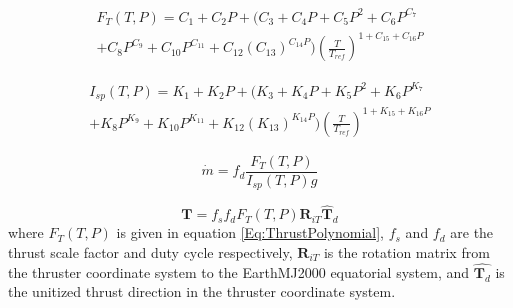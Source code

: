\begin{footnotesize}

\begin{equation}
\begin{split}
    F_T(T,P) = C_1 + C_2 P +  (C_3 + C_4 P + C_5 P^2 + C_6 P^{C_7}\\ +  C_8P^{C_9}
     + C_{10}P^{C_{11}}
    + C_{12}(C_{13})^{C_{14}P})\left(\frac{T}{T_{ref}}\right)^{1 + C_{15} + C_{16}P }
    \label{Eq:ThrustPolynomial}
     \end{split}
\end{equation}

%
\begin{equation}
\begin{split}
    I_{sp}(T,P) = K_1 + K_2 P + (K_3 + K_4 P + K_5 P^2 + K_6 P^{K_7} \\ + K_8P^{K_9} + K_{10}P^{K_{11}}
    + K_{12}(K_{13})^{K_{14}P})\left(\frac{T}{T_{ref}}\right)^{1 + K_{15} + K_{16}P }
         \end{split}
\end{equation}
\end{footnotesize}

\begin{equation}
    \dot{m} =  f_d\frac{F_T(T,P)}{I_{sp}(T,P)g}
\end{equation}

\begin{equation}
    \mathbf{T} = f_s f_d F_T(T,P) \mathbf{R}_{iT}\hat{\mathbf{T}}_d
\end{equation}
%
where $F_T(T,P)$ is given in equation \ref{Eq:ThrustPolynomial},
$f_s$ and $f_d$ are the thrust scale factor and duty cycle
respectively, $\mathbf{R}_{iT}$ is the rotation matrix from the
thruster coordinate system to the EarthMJ2000 equatorial system, and
$\hat{\mathbf{T}_d}$ is the unitized thrust direction in the
thruster coordinate system.

